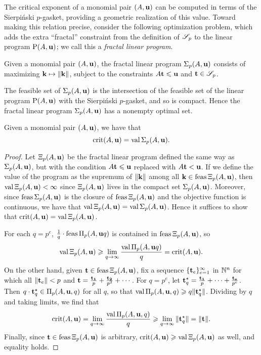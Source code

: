 \documentclass[11pt]{amsart}
\begin{document}
The critical exponent of a monomial pair $(A, \mathbf{u})$ can be computed in terms of the Sierpi\'nski $p$-gasket, providing a geometric realization of this value.
Toward making this relation precise, consider the following optimization problem, which adds the extra ``fractal'' constraint from the definition of $\mathscr{S}_p$ to 
the linear program $\mathrm{P}(A, \mathbf{u})$; we call this a \emph{fractal linear program}.

\begin{definition}
Given a monomial pair $(A, \mathbf{u})$, the fractal linear program $\Sigma_p(A,\mathbf{u})$ consists of maximizing $\mathbf{k}\mapsto \| \mathbf{k} \|$, subject to the constraints $A\mathbf{t}\leqslant \mathbf{u}$ and $\mathbf{t}\in \mathscr{S}_p$.
\end{definition}

\begin{remark}
The feasible set of $\Sigma_p(A, \mathbf{u})$ is the intersection of the feasible set of the linear program $\mathrm{P}(A, \mathbf{u})$ with the Sierpi\'nski $p$-gasket, and so is compact.  Hence the fractal linear program $\Sigma_p(A, \mathbf{u})$ has a nonempty optimal set.
\end{remark}

\begin{proposition}  
Given a monomial pair $(A, \mathbf{u})$, we have that 
\[\operatorname{crit}(A,\mathbf{u}) = \operatorname{val}\Sigma_p(A,\mathbf{u}).\]
\end{proposition}

\begin{proof}
Let $\Xi_p(A, \mathbf{u})$ be the fractal linear program defined the same way as $\Sigma_p(A, \mathbf{u})$, but with the condition $A \mathbf{t} \leqslant \mathbf{u}$ replaced with $A \mathbf{t} < \mathbf{u}$.  If we define the value of the program as the supremum of $\| \mathbf{k} \|$ among all $\mathbf{k} \in \operatorname{feas} \Xi_p(A, \mathbf{u})$, then $\operatorname{val} \Xi_p(A, \mathbf{u}) < \infty$ since $\Xi_p(A, \mathbf{u})$ lives in the compact set $\Sigma_p(A, \mathbf{u})$.
Moreover, since $\operatorname{feas} \Sigma_p(A, \mathbf{u})$ is the closure of $\operatorname{feas}\Xi_p(A, \mathbf{u})$ and the objective function is continuous, we have that $\operatorname{val} \Xi_p(A, \mathbf{u}) = \operatorname{val} \Sigma_p(A, \mathbf{u})$.
Hence it suffices to show that $\operatorname{crit}(A,\mathbf{u}) = \operatorname{val}\Xi_p(A,\mathbf{u})$. 

For each $q=p^e$,  $\frac{1}{q}\cdot\operatorname{feas}\Pi_p(A,\mathbf{u}q)$ is contained in $\operatorname{feas} \Xi_p(A,\mathbf{u})$, so 
\[
\operatorname{val}\Xi_p(A,\mathbf{u}) \geqslant \displaystyle \lim_{q\to \infty}\frac{\operatorname{val}\Pi_p(A,\mathbf{u}q)}{q} = \operatorname{crit}(A,\mathbf{u}).
 \]
On the other hand, given $\mathbf{t} \in \operatorname{feas} \Xi_p(A, \mathbf{u})$, fix a sequence $\{ \mathbf{t}_e \}_{e=1}^\infty$ in $\mathbb{N}^n$ for which all $\| \mathbf{t}_e \| < p$ and 
$\mathbf{t} = \frac{\mathbf{t_1}}{p} +\frac{\mathbf{t_2}}{p^2}+\cdots$.  For $q = p^e$, let 
 $\mathbf{t}^\star_q = \frac{\mathbf{t_1}}{p} + \cdots + \frac{\mathbf{t_e}}{p^e}$.  Then $q \cdot \mathbf{t}^\star_q \in \Pi_p(A, \mathbf{u}, q)$ for all $q$, so that $\operatorname{val} \Pi_p(A, \mathbf{u}, q) \geqslant q \| \mathbf{t}^\star_q \|$. 
 Dividing by $q$ and taking limits, we find that  
 \[
\operatorname{crit}(A,\mathbf{u}) = \lim_{q\to \infty} \frac{\operatorname{val} \Pi_p(A, \mathbf{u}, q)}{q} \geqslant \lim_{q \to \infty}   \| \mathbf{t}^\star_q \| = \| \mathbf{t} \|.
 \]
Finally, since $\mathbf{t} \in \operatorname{feas} \Xi_p(A, \mathbf{u})$ is arbitrary, $\operatorname{crit}(A, \mathbf{u}) \geqslant \operatorname{val} \Xi_p(A, \mathbf{u})$ as well, and equality holds. 
\end{proof}
\end{document}
